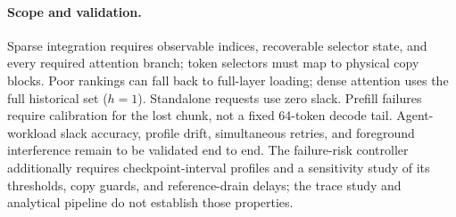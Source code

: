 \paragraph{Scope and validation.}
\label{sec:design-discussion}
Sparse integration requires observable indices, recoverable selector
state, and every required attention branch; token selectors must map
to physical copy blocks. Poor rankings can fall back to full-layer
loading; dense attention uses the full historical set ($h=1$). Standalone requests
use zero slack. Prefill failures require calibration for the lost chunk,
not a fixed 64-token decode tail. Agent-workload slack accuracy, profile
drift, simultaneous retries, and foreground interference remain to be
validated end to end. The failure-risk controller additionally requires
checkpoint-interval profiles and a sensitivity study of its thresholds,
copy guards, and reference-drain delays; the trace study and analytical
pipeline do not establish those properties.
